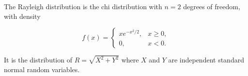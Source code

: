 The Rayleigh distribution is the chi distribution with $n = 2$ degrees of freedom, with density

$$f(x) = \begin{cases} x e^{-x^2/2}, & x \geq 0, \\ 0, & x < 0. \end{cases}$$

It is the distribution of $R = \sqrt{X^2 + Y^2}$ where $X$ and $Y$ are independent standard normal random variables.
